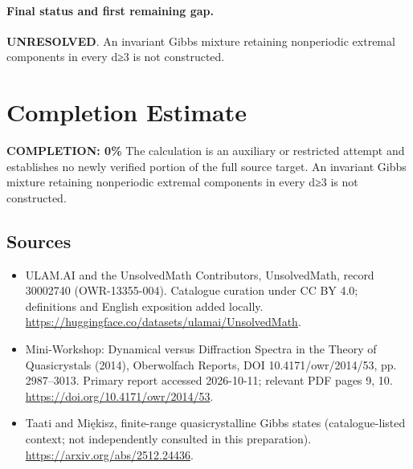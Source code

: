 \documentclass[11pt]{article}
\begin{document}
\paragraph{Final status and first remaining gap.}
\textbf{UNRESOLVED}. An invariant Gibbs mixture retaining nonperiodic extremal components in every d≥3 is not constructed.

\section{Completion Estimate}
\noindent\textbf{COMPLETION: 0\%}
The calculation is an auxiliary or restricted attempt and establishes no newly verified portion of the full source target. An invariant Gibbs mixture retaining nonperiodic extremal components in every d≥3 is not constructed.

\subsection{Sources}
\begin{itemize}
\item[\hypertarget{source:30002740:1}{S1}] ULAM.AI and the UnsolvedMath Contributors, UnsolvedMath, record 30002740 (OWR-13355-004). Catalogue curation under CC BY 4.0; definitions and English exposition added locally.
\url{https://huggingface.co/datasets/ulamai/UnsolvedMath}.
\item[\hypertarget{source:30002740:2}{S2}] Mini-Workshop: Dynamical versus Diffraction Spectra in the Theory of Quasicrystals (2014), Oberwolfach Reports, DOI 10.4171/owr/2014/53, pp. 2987--3013. Primary report accessed 2026-10-11; relevant PDF pages 9, 10.
\url{https://doi.org/10.4171/owr/2014/53}.
\item[\hypertarget{source:30002740:3}{S3}] Taati and Miękisz, finite-range quasicrystalline Gibbs states (catalogue-listed context; not independently consulted in this preparation).
\url{https://arxiv.org/abs/2512.24436}.
\end{itemize}
\label{end:30002740}
\end{document}
